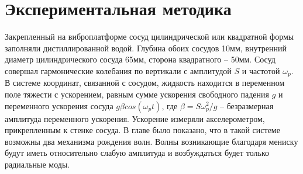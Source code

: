 \section{Экспериментальная методика}\label{sect3_2}
Закрепленный на виброплатформе сосуд цилиндрической или квадратной формы заполняли дистиллированной водой. Глубина обоих сосудов 10мм, внутренний диаметр цилиндрического сосуда 65мм, сторона квадратного – 50мм. Сосуд совершал гармонические колебания по вертикали с амплитудой $S$ и частотой $\omega_p$. В системе координат, связанной с сосудом, жидкость находится в переменном поле тяжести с ускорением, равным сумме ускорения свободного падения $g$ и переменного ускорения сосуда $g \beta cos(\omega_p t)$, где $\beta = S \omega_p^2/g$ – безразмерная амплитуда переменного ускорения. Ускорение измеряли акселерометром, прикрепленным к стенке сосуда. В главе  было показано, что в такой системе возможны два механизма рождения волн. Волны возникающие благодаря мениску будут иметь относительно слабую амплитуда и возбуждаться будет только радиальные моды.


